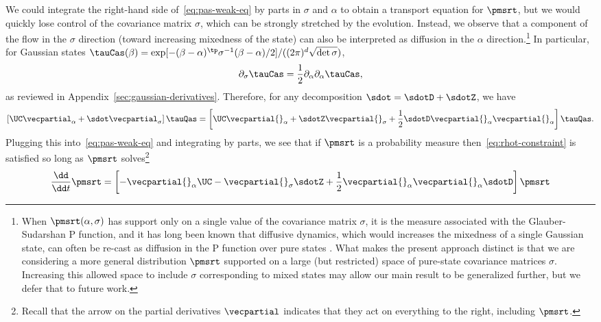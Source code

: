 \documentclass{article}
\numberwithin{equation}{section}
\begin{document}
We could integrate the right-hand side of~\eqref{eq:pas-weak-eq} by parts in $\sigma$ and $\alpha$ to obtain a transport equation for $\pmsrt$, 
but we would quickly lose control of the covariance matrix $\sigma$, which can be strongly stretched by the evolution.
Instead, we observe that a component of the flow in the $\sigma$ direction (toward increasing mixedness of the state) can also be interpreted
as diffusion in the $\alpha$ direction.\footnote{When $\pmsrt(\alpha,\sigma)$ has support only on a single value of the covariance matrix $\sigma$, it is the measure associated with the  Glauber-Sudarshan P function, and it has long been known that diffusive dynamics, which would increases the mixedness of a single Gaussian state, can often be re-cast as diffusion in the P function over pure states \cite{weidlich1967quantumI, weidlich1967quantumII, haken1967quantum, lax1967quantum, isar1991quasiprobability, diosi2000robustness}.  What makes the present approach distinct is that we are considering a more general distribution $\pmsrt$ supported on a large (but restricted) space of pure-state covariance matrices $\sigma$.  Increasing this allowed space to include $\sigma$ corresponding to mixed states may allow our main result to be generalized further, but we defer that to future work.}  In particular, for 
Gaussian states $\tauCas(\beta) = \exp[-(\beta-\alpha)^\tp \sigma^{-1}(\beta-\alpha)/2]/((2\pi)^d\sqrt{\det\sigma})$,
\begin{align}\label{eq:covar-diff-relation}
    \partial_{\sigma} \tauCas = \frac{1}{2} \partial_{\alpha}  \partial_{\alpha} \tauCas,
\end{align}
as reviewed in Appendix~\ref{sec:gaussian-derivatives}.
Therefore, for any decomposition $\sdot=\sdotD+\sdotZ$, we have
\begin{equation}\label{eq:gauss-deriv-iden}
\left[\UC\vecpartial_\alpha
+ \sdot \vecpartial_\sigma\right]
\tauQas = 
\left[\UC\vecpartial{}_\alpha
+ \sdotZ \vecpartial{}_\sigma 
+ \frac{1}{2} \sdotD \vecpartial{}_\alpha\vecpartial{}_\alpha \right]
\tauQas.
\end{equation}
Plugging this into~\eqref{eq:pas-weak-eq} and integrating by parts, we see that if $\pmsrt$ is a probability measure then~\eqref{eq:rhot-constraint} is satisfied so long as 
$\pmsrt$ solves\footnote{Recall that the arrow on the partial derivatives $\vecpartial$ indicates that they act on everything to the right, including $\pmsrt$.}
\begin{equation}
\label{eq:pas-evolution-eq}
\frac{\dd}{\dd t}\pmsrt = \left[-\vecpartial{}_\alpha \UC 
-\vecpartial{}_\sigma \sdotZ 
+ \frac{1}{2} \vecpartial{}_\alpha\vecpartial{}_\alpha \sdotD\right]\pmsrt
\end{equation}
\end{document}
